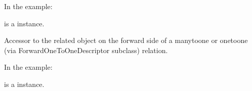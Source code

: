 \documentclass[letterpaper,10pt,french]{sphinxmanual}
\begin{document}
\begin{fulllineitems}
\begin{fulllineitems}
\sphinxAtStartPar
In the example:

\begin{sphinxVerbatim}[commandchars=\\\{\}]
 
       
\end{sphinxVerbatim}

\sphinxAtStartPar
{} is a  instance.

\end{fulllineitems}


\begin{fulllineitems}
\label{\detokenize{main/model:main.models.Note.etudiant_id}}
\pysigstartsignatures
{}
\pysigstopsignatures
\end{fulllineitems}


\begin{fulllineitems}
\label{\detokenize{main/model:main.models.Note.evaluation}}
\pysigstartsignatures
{}
\pysigstopsignatures
\sphinxAtStartPar
Accessor to the related object on the forward side of a many\sphinxhyphen{}to\sphinxhyphen{}one or
one\sphinxhyphen{}to\sphinxhyphen{}one (via ForwardOneToOneDescriptor subclass) relation.

\sphinxAtStartPar
In the example:

\begin{sphinxVerbatim}[commandchars=\\\{\}]
 
       
\end{sphinxVerbatim}

\sphinxAtStartPar
{} is a  instance.


\end{fulllineitems}
\end{fulllineitems}
\end{document}

